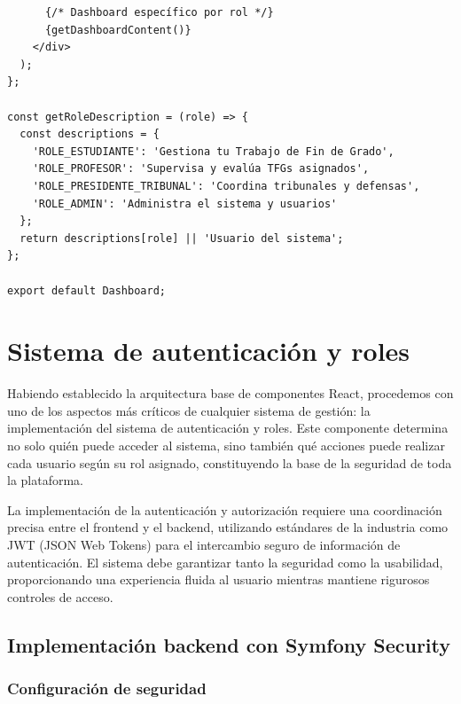 \documentclass[12pt,a4paper,oneside]{report}
\begin{document}
\begin{lstlisting}
      {/* Dashboard específico por rol */}
      {getDashboardContent()}
    </div>
  );
};

const getRoleDescription = (role) => {
  const descriptions = {
    'ROLE_ESTUDIANTE': 'Gestiona tu Trabajo de Fin de Grado',
    'ROLE_PROFESOR': 'Supervisa y evalúa TFGs asignados',
    'ROLE_PRESIDENTE_TRIBUNAL': 'Coordina tribunales y defensas',
    'ROLE_ADMIN': 'Administra el sistema y usuarios'
  };
  return descriptions[role] || 'Usuario del sistema';
};

export default Dashboard;
\end{lstlisting}

\section{Sistema de autenticación y
roles}\label{sistema-de-autenticaciuxf3n-y-roles}

Habiendo establecido la arquitectura base de componentes React,
procedemos con uno de los aspectos más críticos de cualquier sistema de
gestión: la implementación del sistema de autenticación y roles. Este
componente determina no solo quién puede acceder al sistema, sino
también qué acciones puede realizar cada usuario según su rol asignado,
constituyendo la base de la seguridad de toda la plataforma.

La implementación de la autenticación y autorización requiere una
coordinación precisa entre el frontend y el backend, utilizando
estándares de la industria como JWT (JSON Web Tokens) para el
intercambio seguro de información de autenticación. El sistema debe
garantizar tanto la seguridad como la usabilidad, proporcionando una
experiencia fluida al usuario mientras mantiene rigurosos controles de
acceso.

\subsection{Implementación backend con Symfony
Security}\label{implementaciuxf3n-backend-con-symfony-security}

\subsubsection{Configuración de
seguridad}\label{configuraciuxf3n-de-seguridad}
\end{document}
